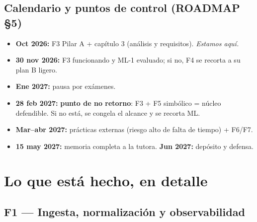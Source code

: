 \documentclass[11pt,a4paper]{article}
\begin{document}
\subsection*{Calendario y puntos de control (ROADMAP §5)}
\begin{itemize}
  \item \textbf{Oct 2026:} F3 Pilar A + capítulo 3 (análisis y requisitos). \textit{Estamos aquí.}
  \item \textbf{30 nov 2026:} F3 funcionando y ML-1 evaluado; si no, F4 se recorta a su plan B ligero.
  \item \textbf{Ene 2027:} pausa por exámenes.
  \item \textbf{28 feb 2027:} \textbf{punto de no retorno}: F3 + F5 simbólico = núcleo defendible.
        Si no está, se congela el alcance y se recorta ML.
  \item \textbf{Mar–abr 2027:} prácticas externas (riesgo alto de falta de tiempo) + F6/F7.
  \item \textbf{15 may 2027:} memoria completa a la tutora. \textbf{Jun 2027:} depósito y defensa.
\end{itemize}

\newpage
\section{Lo que está hecho, en detalle}\label{sec:hecho}

\subsection{F1 — Ingesta, normalización y observabilidad}
\end{document}
